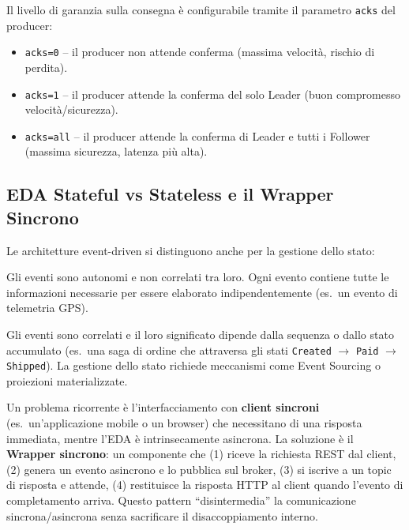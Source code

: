 \documentclass[12pt,a4paper]{report}
\begin{document}
\begin{description}[style=nextline, leftmargin=1.5cm]
  \item[\textsf{Acknowledgments (ACKs)}]
    Il livello di garanzia sulla consegna è configurabile tramite il parametro
    \texttt{acks} del producer:
    \begin{itemize}
      \item \texttt{acks=0} -- il producer non attende conferma (massima velocità,
            rischio di perdita).
      \item \texttt{acks=1} -- il producer attende la conferma del solo Leader
            (buon compromesso velocità/sicurezza).
      \item \texttt{acks=all} -- il producer attende la conferma di Leader e tutti
            i Follower (massima sicurezza, latenza più alta).
    \end{itemize}
\end{description}

\subsection{EDA Stateful vs Stateless e il Wrapper Sincrono}

Le architetture event-driven si distinguono anche per la gestione dello stato:

\begin{description}[style=nextline, leftmargin=1.5cm]
  \item[\textsf{Stateless EDA}]
    Gli eventi sono autonomi e non correlati tra loro. Ogni evento contiene
    tutte le informazioni necessarie per essere elaborato indipendentemente
    (es.\ un evento di telemetria GPS).

  \item[\textsf{Stateful EDA}]
    Gli eventi sono correlati e il loro significato dipende dalla sequenza o
    dallo stato accumulato (es.\ una saga di ordine che attraversa gli stati
    \texttt{Created} $\rightarrow$ \texttt{Paid} $\rightarrow$ \texttt{Shipped}).
    La gestione dello stato richiede meccanismi come Event Sourcing o proiezioni
    materializzate.
\end{description}

Un problema ricorrente è l'interfacciamento con \textbf{client sincroni}
(es.\ un'applicazione mobile o un browser) che necessitano di una risposta
immediata, mentre l'EDA è intrinsecamente asincrona. La soluzione è il
\textbf{Wrapper sincrono}: un componente che (1) riceve la richiesta REST dal
client, (2) genera un evento asincrono e lo pubblica sul broker, (3) si
iscrive a un topic di risposta e attende, (4) restituisce la risposta HTTP
al client quando l'evento di completamento arriva. Questo pattern
``disintermedia'' la comunicazione sincrona/asincrona senza sacrificare il
disaccoppiamento interno.
\end{document}

